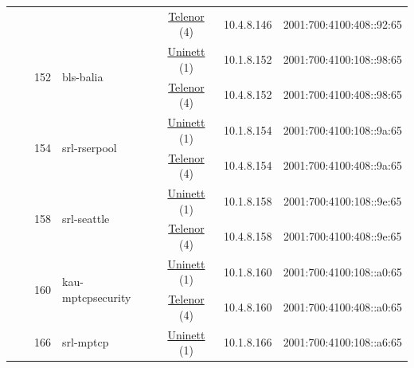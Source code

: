 \begin{small}
\begin{center}
\begin{longtable}{|c|c|c|c|c|c|c|c|}
  &  &  &  & \multicolumn{2}{|c|}{\tiny{\href{https://www.telenor.no}{Telenor} (4)}} & \tiny{10.4.8.146} & \tiny{2001:700:4100:408::92:65} \\* \cline{3-3}\cline{4-4}\cline{5-5}\cline{6-6}\cline{7-7}\cline{8-8}
  &  & \multirow{2}{*}{\tiny{152}} & \multicolumn{1}{|l|}{\multirow{2}{*}{\tiny{bls-balia}}} & \multicolumn{2}{|c|}{\tiny{\href{https://www.uninett.no}{Uninett} (1)}} & \tiny{10.1.8.152} & \tiny{2001:700:4100:108::98:65} \\* \cline{5-5}\cline{6-6}\cline{7-7}\cline{8-8}
  &  &  &  & \multicolumn{2}{|c|}{\tiny{\href{https://www.telenor.no}{Telenor} (4)}} & \tiny{10.4.8.152} & \tiny{2001:700:4100:408::98:65} \\* \cline{3-3}\cline{4-4}\cline{5-5}\cline{6-6}\cline{7-7}\cline{8-8}
  &  & \multirow{2}{*}{\tiny{154}} & \multicolumn{1}{|l|}{\multirow{2}{*}{\tiny{srl-rserpool}}} & \multicolumn{2}{|c|}{\tiny{\href{https://www.uninett.no}{Uninett} (1)}} & \tiny{10.1.8.154} & \tiny{2001:700:4100:108::9a:65} \\* \cline{5-5}\cline{6-6}\cline{7-7}\cline{8-8}
  &  &  &  & \multicolumn{2}{|c|}{\tiny{\href{https://www.telenor.no}{Telenor} (4)}} & \tiny{10.4.8.154} & \tiny{2001:700:4100:408::9a:65} \\* \cline{3-3}\cline{4-4}\cline{5-5}\cline{6-6}\cline{7-7}\cline{8-8}
  &  & \multirow{2}{*}{\tiny{158}} & \multicolumn{1}{|l|}{\multirow{2}{*}{\tiny{srl-seattle}}} & \multicolumn{2}{|c|}{\tiny{\href{https://www.uninett.no}{Uninett} (1)}} & \tiny{10.1.8.158} & \tiny{2001:700:4100:108::9e:65} \\* \cline{5-5}\cline{6-6}\cline{7-7}\cline{8-8}
  &  &  &  & \multicolumn{2}{|c|}{\tiny{\href{https://www.telenor.no}{Telenor} (4)}} & \tiny{10.4.8.158} & \tiny{2001:700:4100:408::9e:65} \\* \cline{3-3}\cline{4-4}\cline{5-5}\cline{6-6}\cline{7-7}\cline{8-8}
  &  & \multirow{2}{*}{\tiny{160}} & \multicolumn{1}{|l|}{\multirow{2}{*}{\tiny{kau-mptcpsecurity}}} & \multicolumn{2}{|c|}{\tiny{\href{https://www.uninett.no}{Uninett} (1)}} & \tiny{10.1.8.160} & \tiny{2001:700:4100:108::a0:65} \\* \cline{5-5}\cline{6-6}\cline{7-7}\cline{8-8}
  &  &  &  & \multicolumn{2}{|c|}{\tiny{\href{https://www.telenor.no}{Telenor} (4)}} & \tiny{10.4.8.160} & \tiny{2001:700:4100:408::a0:65} \\* \cline{3-3}\cline{4-4}\cline{5-5}\cline{6-6}\cline{7-7}\cline{8-8}
  &  & \multirow{2}{*}{\tiny{166}} & \multicolumn{1}{|l|}{\multirow{2}{*}{\tiny{srl-mptcp}}} & \multicolumn{2}{|c|}{\tiny{\href{https://www.uninett.no}{Uninett} (1)}} & \tiny{10.1.8.166} & \tiny{2001:700:4100:108::a6:65} \\* \cline{5-5}\cline{6-6}\cline{7-7}\cline{8-8}

\end{longtable}
\end{center}
\end{small}
